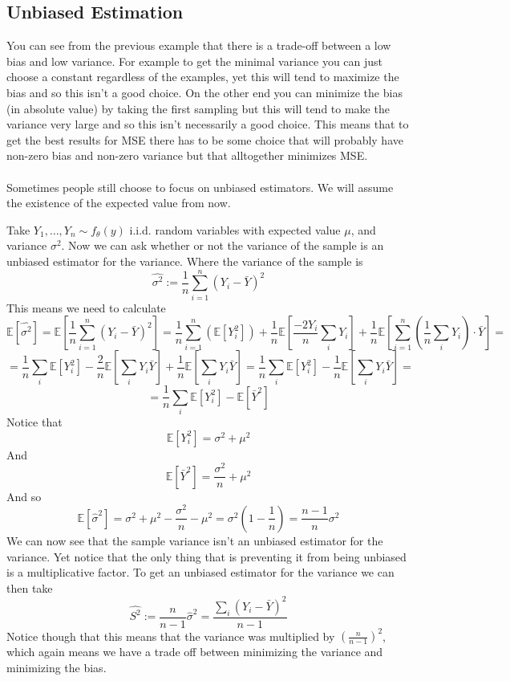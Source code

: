\documentclass[../main.tex]{subfiles}
\begin{document}
\subsection{Unbiased Estimation}
You can see from the previous example that there is a trade-off between a low bias and low variance. For example to get the minimal variance you can just choose a constant regardless of the examples, yet this will tend to maximize the bias and so this isn't a good choice. On the other end you can minimize the bias (in absolute value) by taking the first sampling but this will tend to make the variance very large and so this isn't necessarily a good choice. This means that to get the best results for MSE there has to be some choice that will probably have non-zero bias and non-zero variance but that alltogether minimizes MSE. \\\\
Sometimes people still choose to focus on unbiased estimators. We will assume the existence of the expected value from now.
\begin{example}
Take $Y_1,\dots,Y_n\sim f_{\theta}(y)$ i.i.d. random variables with expected value $\mu$, and variance $\sigma^2$. Now we can ask whether or not the variance of the sample is an unbiased estimator for the variance. Where the variance of the sample is
\[\hat{\sigma^2}:=\frac{1}{n}\sum_{i=1}^n (Y_i-\bar{Y})^2\]
This means we need to calculate \[\mathbb{E}\left[\hat{\sigma^2}\right]= \mathbb{E}\left[\frac{1}{n}\sum_{i=1}^n (Y_i-\bar{Y})^2\right] = \frac{1}{n}\sum_{i=1}^n \left(\mathbb{E}\left[Y_i^2\right]\right)+\frac{1}{n}\mathbb{E}\left[\frac{-2Y_i}{n}\sum_i Y_i\right]+\frac{1}{n}\mathbb{E}\left[\sum_{i=1}^n \left(\frac{1}{n}\sum_i Y_i\right)\cdot \bar{Y}\right]=\]\[=\frac{1}{n}\sum_i\mathbb{E}\left[Y_i^2\right]-\frac{2}{n}\mathbb{E}\left[\sum_i Y_i\bar{Y}\right]+\frac{1}{n}\mathbb{E}\left[\sum_i Y_i\bar{Y}\right]=\frac{1}{n}\sum_i\mathbb{E}\left[Y_i^2\right] - \frac{1}{n}\mathbb{E}\left[\sum_i Y_i\bar{Y}\right]=\]\[=\frac{1}{n}\sum_i\mathbb{E}\left[Y_i^2\right]-\mathbb{E}\left[\bar{Y}^2\right]\]
Notice that \[\mathbb{E}\left[Y_i^2\right]=\sigma^2+\mu^2\]
And 
\[\mathbb{E}\left[\bar{Y}^2\right]=\frac{\sigma^2}{n}+\mu^2\]
And so 
\[\mathbb{E}[\hat{\sigma}^2]=\sigma^2+\mu^2-\frac{\sigma^2}{n}-\mu^2= \sigma^2\left(1-\frac{1}{n}\right)=\frac{n-1}{n}\sigma^2\]
We can now see that the sample variance isn't an unbiased estimator for the variance. Yet notice that the only thing that is preventing it from being unbiased is a multiplicative factor. To get an unbiased estimator for the variance we can then take
\[\hat{S^2}:=\frac{n}{n-1}\hat{\sigma}^2=\frac{\sum_i(Y_i-\bar{Y})^2}{n-1}\]
Notice though that this means that the variance was multiplied by $(\frac{n}{n-1})^2$, which again means we have a trade off between minimizing the variance and minimizing the bias. \end{example}
\end{document}
